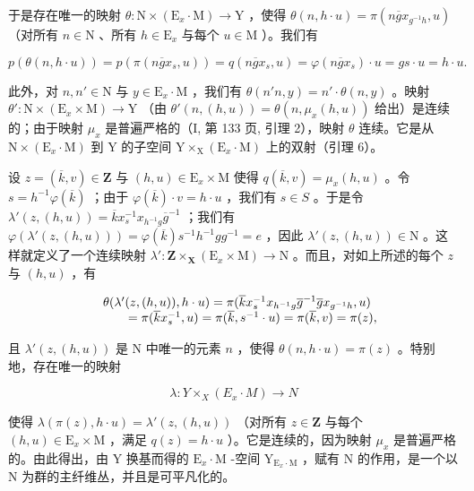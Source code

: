 于是存在唯一的映射 \(\theta\colon\mathrm{N}\times(\mathrm{E}_{x}\cdot\mathrm{M})\to\mathrm{Y}\) ，使得 \(\theta(n,h\cdot u)=\pi(n\overline{g}x_{g^{-1}h},u)\) （对所有 \(n\in\mathrm{N}\) 、所有 \(h\in\mathrm{E}_{x}\) 与每个 \(u\in\mathrm{M}\) ）。我们有

\[
p (\theta (n, h \cdot u)) = p (\pi (n \overline {{g}} x _ {s}, u)) = q (n \overline {{g}} x _ {s}, u) = \varphi (n \overline {{g}} x _ {s}) \cdot u = g s \cdot u = h \cdot u.
\]

此外，对 \(n, n' \in \mathrm{N}\) 与 \(y \in \mathrm{E}_x \cdot \mathrm{M}\) ，我们有 \(\theta(n'n, y) = n' \cdot \theta(n, y)\) 。映射 \(\theta'\colon \mathrm{N} \times (\mathrm{E}_x \times \mathrm{M}) \to \mathrm{Y}\) （由 \(\theta'(n, (h, u)) = \theta(n, \mu_x(h, u))\) 给出）是连续的；由于映射 \(\mu_x\) 是普遍严格的（I, 第 133 页, 引理 2），映射 \(\theta\) 连续。它是从 \(\mathrm{N} \times (\mathrm{E}_x \cdot \mathrm{M})\) 到 Y 的子空间 \(\mathrm{Y} \times_{\mathrm{X}} (\mathrm{E}_x \cdot \mathrm{M})\) 上的双射（引理 6）。

设 \(z = (\overline{k}, v) \in \mathbf{Z}\) 与 \((h, u) \in \mathrm{E}_x \times \mathrm{M}\) 使得 \(q(\overline{k}, v) = \mu_x(h, u)\) 。令 \(s = h^{-1}\varphi(\overline{k})\) ；由于 \(\varphi(\overline{k}) \cdot v = h \cdot u\) ，我们有 \(s \in S\) 。于是令 \(\lambda'(z, (h, u)) = \overline{k} x_s^{-1} x_{h^{-1}g} \overline{g}^{-1}\) ；我们有 \(\varphi(\lambda'(z, (h, u))) = \varphi(\overline{k}) s^{-1} h^{-1} gg^{-1} = e\) ，因此 \(\lambda'(z, (h, u)) \in \mathrm{N}\) 。这样就定义了一个连续映射 \(\lambda' \colon \mathbf{Z} \times_{\mathbf{X}} (\mathrm{E}_x \times \mathrm{M}) \to \mathrm{N}\) 。而且，对如上所述的每个 \(z\) 与 \((h, u)\) ，有

\[
\begin{array}{r l} & {\theta (\lambda^ {\prime} (z, (h, u)), h \cdot u) = \pi (\overline {{k}} x _ {s} ^ {- 1} x _ {h ^ {- 1} g} \overline {{g}} ^ {- 1} \overline {{g}} x _ {g ^ {- 1} h}, u)} \\ & {\qquad = \pi (\overline {{k}} x _ {s} ^ {- 1}, u) = \pi (\overline {{k}}, s ^ {- 1} \cdot u) = \pi (\overline {{k}}, v) = \pi (z),} \end{array}
\]

且 \(\lambda'(z,(h,u))\) 是 N 中唯一的元素 \(n\) ，使得 \(\theta(n,h\cdot u)=\pi(z)\) 。特别地，存在唯一的映射

\[
\lambda \colon Y \times_ {X} (E _ {x} \cdot M) \to N
\]

使得 \(\lambda(\pi(z), h \cdot u) = \lambda'(z, (h, u))\) （对所有 \(z \in \mathbf{Z}\) 与每个 \((h, u) \in \mathrm{E}_x \times \mathrm{M}\) ，满足 \(q(z) = h \cdot u\) ）。它是连续的，因为映射 \(\mu_x\) 是普遍严格的。由此得出，由 Y 换基而得的 \(\mathrm{E}_x \cdot \mathrm{M}\) -空间 \(\mathrm{Y}_{\mathrm{E}_x \cdot \mathrm{M}}\) ，赋有 N 的作用，是一个以 N 为群的主纤维丛，并且是可平凡化的。

